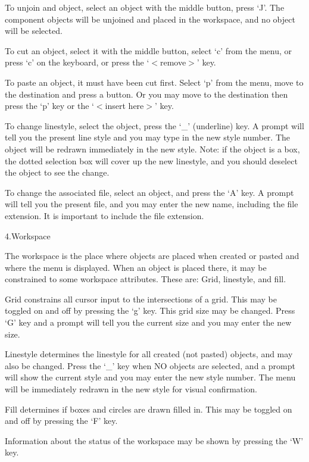 To unjoin and object, select an object with the middle button, press `J'. The
component objects will be unjoined and placed in the workspace, and no object
will be selected.

To cut an object, select it with the middle button, select `c' from 
the menu, or press `c' on the keyboard, or press the `$<$remove$>$' key.

To paste an object, it must have been cut first. Select `p' from the
menu, move to the destination and press a button. Or you may move to the
destination then press the `p' key or the `$<$insert here$>$' key.

To change linestyle, select the object, press the `\_' (underline) key.
A prompt will tell you the present line style and you may type in the new 
style number. The object will be redrawn immediately in the new style.
Note: if the object is a box, the dotted selection box will cover up the new 
linestyle, and you should deselect the object to see the change.

To change the associated file, select an object, and press the `A' key.
A prompt will tell you the present file, and you may enter the new name,
including the file extension. It is important to include the file extension.

\blank
{\modernlarge \item{4.}{Workspace}}

The workspace is the place where objects are placed when created or
pasted and where the menu is displayed. When an object is placed there, it 
may be constrained to some workspace
attributes. These are: Grid, linestyle, and fill. 

Grid constrains all cursor input to the intersections of a
grid. This may be toggled on and off by pressing the `g' key.
This grid size may be changed. Press `G' key and a prompt will tell you
the current size and you may enter the new size.

Linestyle determines the linestyle for all created (not pasted) objects,
and may also be changed. Press the `\_' key when NO objects are selected, and a
prompt will show the current style and you may enter the new style number. The
menu will be immediately redrawn in the new style for visual confirmation.
	
Fill determines if boxes and circles are drawn filled in. This may be
toggled on and off by pressing the `F' key.

Information about the status of the workspace may be shown by pressing
the `W' key.
	

